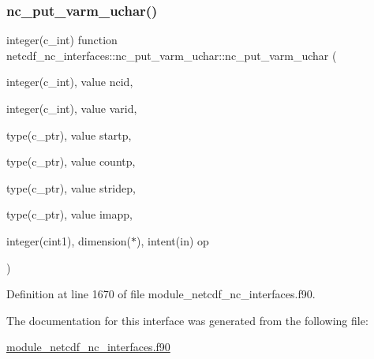 \subsubsection{\texorpdfstring{nc\+\_\+put\+\_\+varm\+\_\+uchar()}{nc\_put\_varm\_uchar()}}
{\footnotesize\ttfamily integer(c\+\_\+int) function netcdf\+\_\+nc\+\_\+interfaces\+::nc\+\_\+put\+\_\+varm\+\_\+uchar\+::nc\+\_\+put\+\_\+varm\+\_\+uchar (\begin{DoxyParamCaption}\item[{integer(c\+\_\+int), value}]{ncid,  }\item[{integer(c\+\_\+int), value}]{varid,  }\item[{type(c\+\_\+ptr), value}]{startp,  }\item[{type(c\+\_\+ptr), value}]{countp,  }\item[{type(c\+\_\+ptr), value}]{stridep,  }\item[{type(c\+\_\+ptr), value}]{imapp,  }\item[{integer(cint1), dimension($\ast$), intent(in)}]{op }\end{DoxyParamCaption})}



Definition at line 1670 of file module\+\_\+netcdf\+\_\+nc\+\_\+interfaces.\+f90.



The documentation for this interface was generated from the following file\+:\begin{DoxyCompactItemize}
\item 
\hyperlink{module__netcdf__nc__interfaces_8f90}{module\+\_\+netcdf\+\_\+nc\+\_\+interfaces.\+f90}\end{DoxyCompactItemize}
